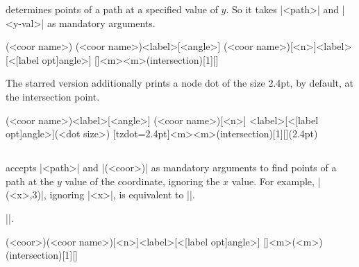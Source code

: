 \icmd{\tzhXpointat} determines  points of a path at a specified value of $y$.
So it takes |{<path>}| and |{<y-val>}| as mandatory arguments.

\begin{tzdef}
(<coor name>)
(<coor name>){<label>}[<angle>]
(<coor name>)[<n>]{<label>}[<[label opt]angle>]
  []{<m>}{<m>}(intersection)[1]{}[]
\end{tzdef}


The starred version \icmd{\tzhXpointat*} additionally prints a node dot of the size 2.4pt, by default, at the intersection point.

\begin{tzdef}
(<coor name>){<label>}[<angle>]
(<coor name>)[<n>]
             {<label>}[<[label opt]angle>](<dot size>)
  [tzdot=2.4pt]{<m>}{<m>}(intersection)[1]{}[](2.4pt)
\end{tzdef}

\begin{tzcode}{.3}
\end{tzcode}

\subsection{\protect\cmd{\tzhXpoint(*)}}
\label{ss:tzhXpoint}

\icmd{\tzhXpoint} accepts |{<path>}| and |(<coor>)| as mandatory arguments to find  points of a path at the $y$ value of the coordinate, ignoring the $x$ value.
For example, |(<x>,3)|, ignoring |<x>|, is equivalent to ||.

 |\tzhXpointat|.

\begin{tzdef}
(<coor>)(<coor name>)[<n>]{<label>}[<[label opt]angle>]
  []{<m>}(<m>)(intersection)[1]{}[]
\end{tzdef}

